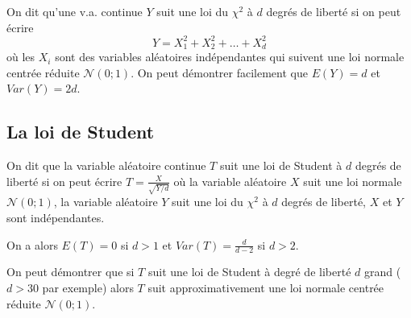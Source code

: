 \documentclass[12pt, a4paper]{article}
\begin{document}
On dit qu'une v.a. continue $Y$ suit une loi du $\chi^2$ à $d$ degrés de liberté si on peut écrire
$$
Y=X_1^2 + X_2^2 + \hdots + X_d^2
$$
où les $X_i$ sont des variables aléatoires indépendantes qui suivent une loi normale centrée réduite $\mathcal{N}(0;1)$. On peut démontrer facilement que $E(Y)=d$ et $Var(Y)=2d$.

\subsection{La loi de Student}
On dit que la variable aléatoire continue $T$ suit une loi de Student à $d$ degrés de liberté si on peut écrire $ T=\frac{X}{\sqrt{Y/d}}$ 
où la variable aléatoire $X$ suit une loi normale $\mathcal{N}(0;1)$, 
la variable aléatoire $Y$ suit une loi du $\chi^2$ à $d$ degrés de liberté, 
$X$ et $Y$ sont indépendantes.

On a alors $E(T)=0$ si $d>1$ et $Var(T)=\frac{d}{d-2}$ si $d>2$.

On peut démontrer que si $T$ suit une loi de Student à degré de liberté $d$ grand ($d>30$ par exemple) 
alors $T$ suit approximativement une loi normale centrée réduite $\mathcal{N}(0;1)$.
\end{document}
